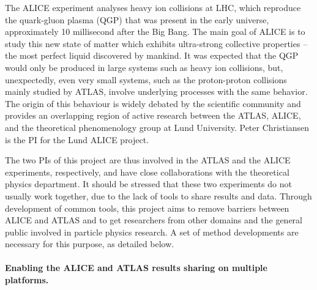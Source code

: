\documentclass[a4paper,justified]{tufte-handout}
\begin{document}
The ALICE experiment analyses heavy ion collisions at LHC, which reproduce the
quark-gluon plasma (QGP) that was present in the early universe, approximately
10 millisecond after the Big Bang.  The main goal of ALICE is to study this
new state of matter which exhibits ultra-strong collective properties -- the
most perfect liquid discovered by mankind. It was expected that the QGP would
only be produced in large systems such as heavy ion collisions, but,
unexpectedly, even very small systems, such as the proton-proton collisions
mainly studied by ATLAS, involve underlying processes with the same
behavior. The origin of this behaviour is widely debated by the scientific
community and provides an overlapping region of active research between the
ATLAS, ALICE, and the theoretical phenomenology group at Lund
University. Peter Christiansen is the PI for the Lund ALICE project.

The two PIs of this project are thus involved in the ATLAS and the ALICE
experiments, respectively, and have close collaborations with the theoretical
physics department. It should be stressed that these two experiments do not
usually work together, due to the lack of tools to share results and
data. Through development of common tools, this project aims to remove
barriers between ALICE and ATLAS and to get researchers from other domains and
the general public involved in particle physics research. A set of method
developments are necessary for this purpose, as detailed below.

\vspace{-10px}
\paragraph{Enabling the ALICE and ATLAS results sharing on multiple platforms.} 
\end{document}
